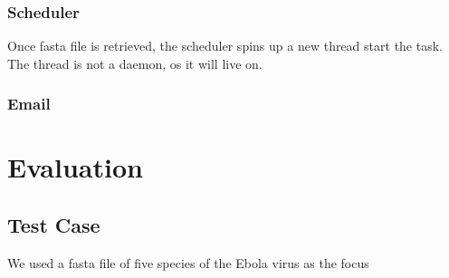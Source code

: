 \documentclass[10pt,letterpaper]{article}
\begin{document}
\subsubsection{Scheduler}


Once fasta file is retrieved, the scheduler spins up a new thread start the task. 
The thread is not a daemon, os it will live on.

\subsubsection{Email}




\section{Evaluation}

\subsection{Test Case}
We used a fasta file of five species of the Ebola virus as the focus



\end{document}
